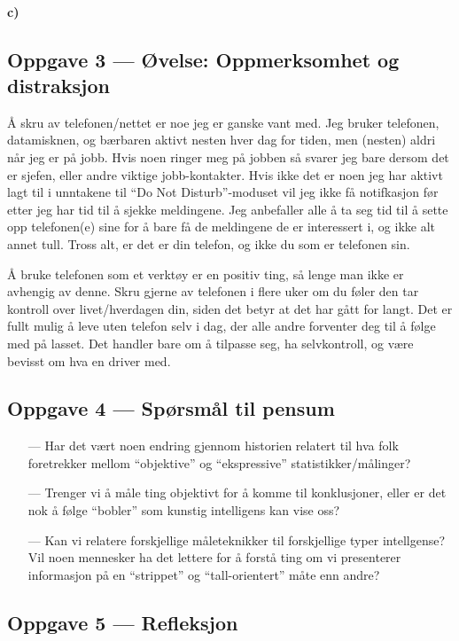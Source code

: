 \documentclass{../../myassignment}
\begin{document}
	\paragraph*{c)}  %


	\subsection*{Oppgave 3 --- Øvelse: Oppmerksomhet og distraksjon}

	{\AA} skru av telefonen/nettet er noe jeg er ganske vant med. Jeg bruker telefonen, datamisknen, og b{\ae}rbaren aktivt nesten hver dag for tiden, men (nesten) aldri n{\aa}r jeg er p{\aa} jobb. Hvis noen ringer meg p{\aa} jobben s{\aa} svarer jeg bare dersom det er sjefen, eller andre viktige jobb-kontakter. Hvis ikke det er noen jeg har aktivt lagt til i unntakene til ``Do Not Disturb''-moduset vil jeg ikke f{\aa} notifkasjon f{\o}r etter jeg har tid til {\aa} sjekke meldingene. Jeg anbefaller alle {\aa} ta seg tid til {\aa} sette opp telefonen(e) sine for {\aa} bare f{\aa} de meldingene de er interessert i, og ikke alt annet tull. Tross alt, er det er din telefon, og ikke du som er telefonen sin. 

	{\AA} bruke telefonen som et verkt{\o}y er en positiv ting, s{\aa} lenge man ikke er avhengig av denne. Skru gjerne av telefonen i flere uker om du f{\o}ler den tar kontroll over livet/hverdagen din, siden det betyr at det har g{\aa}tt for langt. Det er fullt mulig {\aa} leve uten telefon selv i dag, der alle andre forventer deg til {\aa} f{\o}lge med p{\aa} lasset. Det handler bare om {\aa} tilpasse seg, ha selvkontroll, og v{\ae}re bevisst om hva en driver med. 

	\subsection*{Oppgave 4 --- Spørsmål til pensum}

	\begin{itemize}
		\item[---] Har det v{\ae}rt noen endring gjennom historien relatert til hva folk foretrekker mellom ``objektive'' og ``ekspressive'' statistikker/m{\aa}linger?
		\item[---] Trenger vi {\aa} m{\aa}le ting objektivt for {\aa} komme til konklusjoner, eller er det nok {\aa} f{\o}lge ``bobler'' som kunstig intelligens kan vise oss?
		\item[---] Kan vi relatere forskjellige m{\aa}leteknikker til forskjellige typer intellgense? Vil noen mennesker ha det lettere for {\aa} forst{\aa} ting om vi presenterer informasjon p{\aa} en ``strippet'' og ``tall-orientert'' m{\aa}te enn andre? 
	\end{itemize}

	\subsection*{Oppgave 5 --- Refleksjon}

\end{document}
